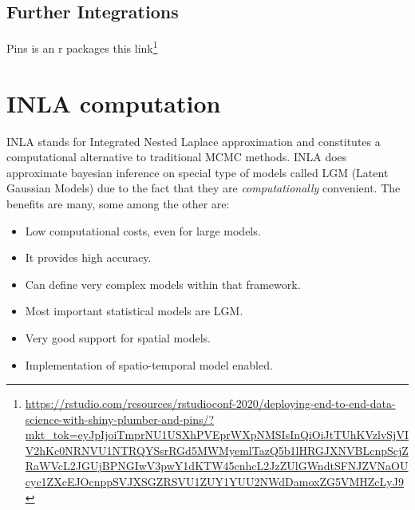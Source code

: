 \documentclass[
  12pt,
  a4paper,
  oneside]{book}
\DeclareRobustCommand{\href}[2]{#2\footnote{\url{#1}}}
\providecommand{\tightlist}{%
  \setlength{\itemsep}{0pt}\setlength{\parskip}{0pt}}
\theoremstyle{definition}
\theoremstyle{definition}
\theoremstyle{definition}
\theoremstyle{remark}
\begin{document}
\hypertarget{further-integrations}{%
\section{Further Integrations}\label{further-integrations}}

Pins is an r packages \href{https://rstudio.com/resources/rstudioconf-2020/deploying-end-to-end-data-science-with-shiny-plumber-and-pins/?mkt_tok=eyJpIjoiTmprNU1USXhPVEprWXpNMSIsInQiOiJtTUhKVzlvSjVIV2hKc0NRNVU1NTRQYSsrRGd5MWMyemlTazQ5b1lHRGJXNVBLcnpScjZRaWVcL2JGUjBPNGIwV3pwY1dKTW45cnhcL2JzZUlGWndtSFNJZVNaOUcyc1ZXcEJOcnppSVJXSGZRSVU1ZUY1YUU2NWdDamoxZG5VMHZcLyJ9}{this link}

\hypertarget{inla}{%
\chapter{INLA computation}\label{inla}}

INLA \citep{Rue2009} stands for Integrated Nested Laplace approximation and constitutes a computational alternative to traditional MCMC methods. INLA does approximate bayesian inference on special type of models called LGM (Latent Gaussian Models) due to the fact that they are \emph{computationally} convenient. The benefits are many, some among the other are:

\begin{itemize}
\tightlist
\item
  Low computational costs, even for large models.
\item
  It provides high accuracy.
\item
  Can define very complex models within that framework.
\item
  Most important statistical models are LGM.
\item
  Very good support for spatial models.
\item
  Implementation of spatio-temporal model enabled.
\end{itemize}
\end{document}
